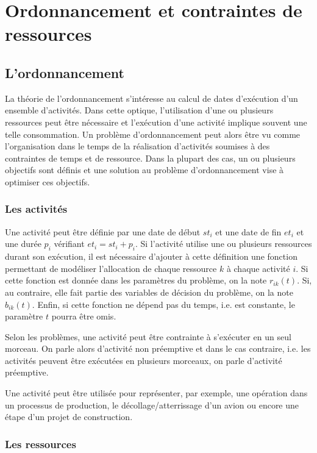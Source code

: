 \section{Ordonnancement et contraintes de ressources}
\label{sec:ordo}
\subsection{L'ordonnancement}
\label{sec:ordo_def}
La théorie de l'ordonnancement s'intéresse au calcul de dates
d'exécution d'un ensemble d'activités. Dans cette optique,
l'utilisation d'une ou plusieurs ressources peut être nécessaire et
l'exécution d'une activité implique souvent une telle consommation. Un
problème d'ordonnancement peut alors être vu comme l'organisation dans
le temps de la réalisation d'activités soumises à des contraintes de
temps et de ressource. Dans la plupart des cas, un ou plusieurs
objectifs sont définis et une solution au problème d'ordonnancement 
vise à optimiser ces objectifs.
 
\subsubsection{Les activités}

Une activité peut être définie par une date de début $st_i$ et une date
de fin $et_i$ et une durée $p_i$ vérifiant $et_i=st_i+p_i$. Si
l'activité utilise une ou plusieurs ressources durant son exécution, il
est nécessaire d'ajouter à cette définition une fonction permettant de
modéliser l'allocation de chaque ressource $k$ à chaque activité
$i$. Si cette fonction est donnée dans les paramètres du 
problème, on la note $r_{ik}(t)$. Si, au contraire, elle fait partie
des variables de décision du problème, on la note $b_{ik}(t)$. Enfin,
si cette fonction ne dépend pas du temps, i.e. est constante, le
paramètre $t$ pourra être omis. 

Selon les problèmes, une activité peut être contrainte à s'exécuter en
un seul morceau. On parle alors d'activité non préemptive et dans le
cas contraire, i.e. les activités peuvent être exécutées en plusieurs
morceaux, on parle d'activité préemptive.

Une activité peut être utilisée pour représenter, par exemple, une
opération dans un processus de production, le décollage/atterrissage
d'un avion ou encore une étape d'un projet de construction.

\subsubsection{Les ressources}

